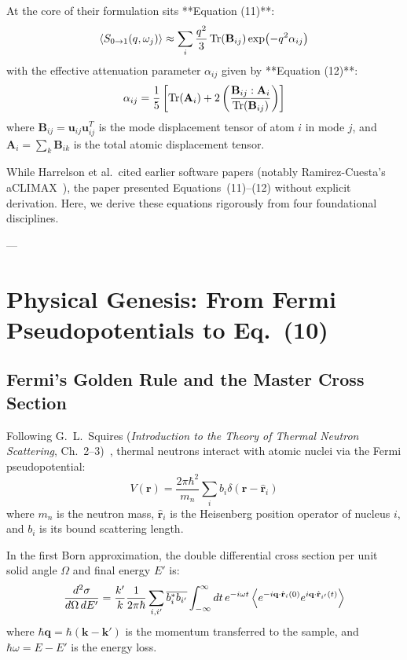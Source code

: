 \documentclass[11pt,a4paper]{article}
\theoremstyle{definition}
\begin{document}
At the core of their formulation sits **Equation (11)**:
\begin{equation}
\ev{S_{0 \to 1}(q, \omega_j)} \approx \sum_i \frac{q^2}{3} \Tr(\mathbf{B}_{ij}) \exp(-q^2 \alpha_{ij})
\label{eq:harrelson11_target}
\end{equation}
with the effective attenuation parameter $\alpha_{ij}$ given by **Equation (12)**:
\begin{equation}
\alpha_{ij} = \frac{1}{5} \left[ \Tr(\mathbf{A}_i) + 2 \left( \frac{\mathbf{B}_{ij} : \mathbf{A}_i}{\Tr(\mathbf{B}_{ij})} \right) \right]
\label{eq:harrelson12_target}
\end{equation}
where $\mathbf{B}_{ij} = \mathbf{u}_{ij} \mathbf{u}_{ij}^T$ is the mode displacement tensor of atom $i$ in mode $j$, and $\mathbf{A}_i = \sum_k \mathbf{B}_{ik}$ is the total atomic displacement tensor.

While Harrelson et al.\ cited earlier software papers (notably Ramirez-Cuesta's aCLIMAX~\cite{ramirez2004}), the paper presented Equations~(11)--(12) without explicit derivation. Here, we derive these equations rigorously from four foundational disciplines.

---

\section{Physical Genesis: From Fermi Pseudopotentials to Eq.~(10)}
\label{sec:quantum_genesis}

\subsection{Fermi's Golden Rule and the Master Cross Section}
Following G.~L.~Squires (\emph{Introduction to the Theory of Thermal Neutron Scattering}, Ch.~2--3)~\cite{squires}, thermal neutrons interact with atomic nuclei via the Fermi pseudopotential:
\begin{equation}
V(\mathbf{r}) = \frac{2\pi \hbar^2}{m_n} \sum_i b_i \delta(\mathbf{r} - \hat{\mathbf{r}}_i)
\end{equation}
where $m_n$ is the neutron mass, $\hat{\mathbf{r}}_i$ is the Heisenberg position operator of nucleus $i$, and $b_i$ is its bound scattering length.

In the first Born approximation, the double differential cross section per unit solid angle $\Omega$ and final energy $E'$ is:
\begin{equation}
\frac{d^2\sigma}{d\Omega \, dE'} = \frac{k'}{k} \frac{1}{2\pi \hbar} \sum_{i, i'} \overline{b_i^* b_{i'}} \int_{-\infty}^\infty dt \, e^{-i\omega t} \ev{e^{-i\mathbf{q}\cdot \hat{\mathbf{r}}_i(0)} e^{i\mathbf{q}\cdot \hat{\mathbf{r}}_{i'}(t)}}
\end{equation}
where $\hbar \mathbf{q} = \hbar(\mathbf{k} - \mathbf{k}')$ is the momentum transferred to the sample, and $\hbar \omega = E - E'$ is the energy loss.
\end{document}
